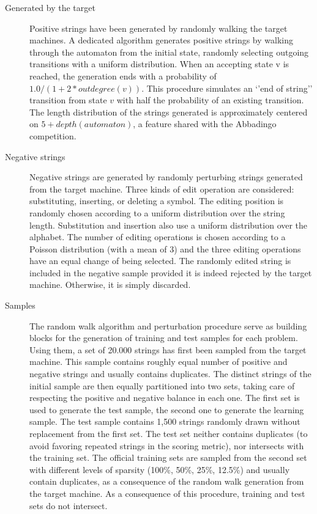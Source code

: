 \begin{description}

\item[Generated by the target] Positive strings have been generated by randomly walking the target machines. A dedicated algorithm generates positive strings by walking through the automaton from the initial state, randomly selecting outgoing transitions with a uniform distribution. When an accepting state v is reached, the generation ends with a probability of $1.0/(1 + 2*outdegree(v))$. This procedure simulates an `'end of string'' transition from state $v$ with half the probability of an existing transition. The length distribution of the strings generated is approximately centered on $5 + depth(automaton)$, a feature shared with the Abbadingo competition.

\item[Negative strings] Negative strings are generated by randomly perturbing strings generated from the target machine. Three kinds of edit operation are considered: substituting, inserting, or deleting a symbol. The editing position is randomly chosen according to a uniform distribution over the string length. Substitution and insertion also use a uniform distribution over the alphabet. The number of editing operations is chosen according to a Poisson distribution (with a mean of 3) and the three editing operations have an equal change of being selected. The randomly edited string is included in the negative sample provided it is indeed rejected by the target machine. Otherwise, it is simply discarded.

\item[Samples] The random walk algorithm and perturbation procedure serve as building blocks for the generation of training and test samples for each problem. Using them, a set of 20.000 strings has first been sampled from the target machine. This sample contains roughly equal number of positive and negative strings and usually contains duplicates. The distinct strings of the initial sample are then equally partitioned into two sets, taking care of respecting the positive and negative balance in each one. The first set is used to generate the test sample, the second one to generate the learning sample. The test sample contains 1,500 strings randomly drawn without replacement from the first set. The test set neither contains duplicates (to avoid favoring repeated strings in the scoring metric), nor intersects with the training set. The official training sets are sampled from the second set with different levels of sparsity (100\%, 50\%, 25\%, 12.5\%) and usually contain duplicates, as a consequence of the random walk generation from the target machine. As a consequence of this procedure, training and test sets do not intersect.


\end{description}
